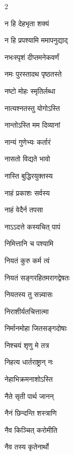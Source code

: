 \begin{multicols}{2}
\begin{indexlist}
\item न हि देहभृता शक्यं \dotfill {}
\item न हि प्रपश्यामि ममापनुद्याद् \dotfill {}
\item नभःस्पृशं दीप्तमनेकवर्णं \dotfill {}
\item नमः पुरस्तादथ पृष्ठतस्ते \dotfill {}
\item नष्टो मोहः स्मृतिर्लब्धा \dotfill {}
\item नात्यश्नतस्तु योगोऽस्ति \dotfill {}
\item नान्तोऽस्ति मम दिव्यानां \dotfill {}
\item नान्यं गुणेभ्यः कर्तारं \dotfill {}
\item नासतो विद्यते भावो \dotfill {}
\item नास्ति बुद्धिरयुक्तस्य \dotfill {}
\item नाहं प्रकाशः सर्वस्य \dotfill {}
\item नाहं वेदैर्न तपसा \dotfill {}
\item नाऽऽदत्ते कस्यचित् पापं \dotfill {}
\item निमित्तानि च पश्यामि \dotfill {}
\item नियतं कुरु कर्म त्वं \dotfill {}
\item नियतं सङ्गरहितमरागद्वेषतः \dotfill {}
\item नियतस्य तु सन्न्यासः \dotfill {}
\item निराशीर्यतचित्तात्मा \dotfill {}
\item निर्मानमोहा जितसङ्गदोषाः \dotfill {}
\item निश्चयं शृणु मे तत्र \dotfill {}
\item निहत्य धार्तराष्ट्रान् नः \dotfill {}
\item नेहाभिक्रमनाशोऽस्ति \dotfill {}
\item नैते सृती पार्थ जानन् \dotfill {}
\item नैनं छिन्दन्ति शस्त्राणि \dotfill {}
\item नैव किञ्चित् करोमीति \dotfill {}
\item नैव तस्य कृतेनार्थो \dotfill {}
\end{indexlist}


\end{multicols}
